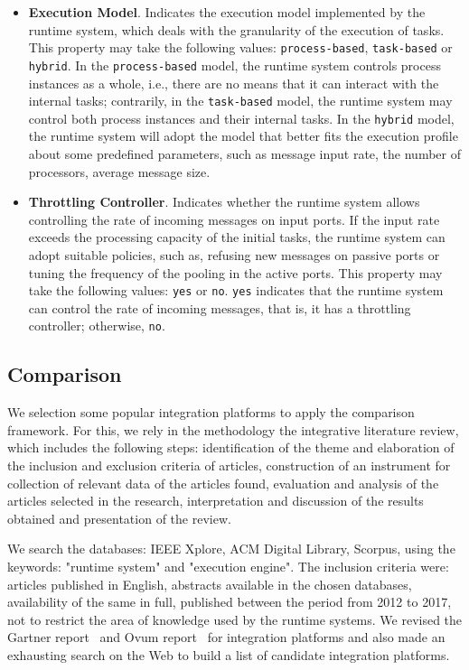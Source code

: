 \begin{itemize}
%
\item \textbf{Execution Model}. Indicates the execution model implemented by the runtime system, which deals with the granularity of the execution of tasks. This property may take the following values: \texttt{process-based}, \texttt{task-based} or \texttt{hybrid}. In the \texttt{process-based} model, the runtime system controls process instances as a whole, i.e., there are no means that it can interact with the internal tasks; contrarily, in the \texttt{task-based} model, the runtime system may control both process instances and their internal tasks. In the \texttt{hybrid} model, the runtime system will adopt the model that better fits the execution profile about some predefined parameters, such as message input rate, the number of processors, average message size. 
%
\item \textbf{Throttling Controller}. Indicates whether the runtime system allows controlling the rate of incoming messages on input ports. If the input rate exceeds the processing capacity of the initial tasks, the runtime system can adopt suitable policies, such as, refusing new messages on passive ports or tuning the frequency of the pooling in the active ports. This property may take the following values: \texttt{yes} or \texttt{no}. \texttt{yes} indicates that the runtime system can control the rate of incoming messages, that is, it has a throttling controller; otherwise, \texttt{no}. 
\end{itemize}

\subsection{{Comparison}}
\label{subsec:comparasion}
\noindent
We selection some popular integration platforms to apply the comparison framework. For this, we rely in the methodology the integrative literature review, which includes the following steps: identification of the theme and elaboration of the inclusion and exclusion criteria of articles, construction of an instrument for collection of relevant data of the articles found, evaluation and analysis of the articles selected in the research, interpretation and discussion of the results obtained and presentation of the review.

We search the databases: IEEE Xplore, ACM Digital Library, Scorpus, using the keywords: "runtime system" and "execution engine". The inclusion criteria were: articles published in English, abstracts available in the chosen databases, availability of the same in full, published between the period from 2012 to 2017, not to restrict the area of knowledge used by the runtime systems.
We revised the Gartner report~\cite{gartner2016,guttridge2017} and Ovum report~\cite{sharma2017} for integration platforms and also made an exhausting search on the Web to build a list of candidate integration platforms. 

